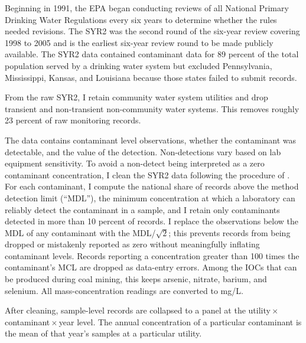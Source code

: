 \documentclass[12pt]{article}
\begin{document}
Beginning in 1991, the EPA began conducting reviews of all National Primary Drinking Water Regulations every six years to determine whether the rules needed revisions. The SYR2 was the second round of the six-year review covering 1998 to 2005 and is the earliest six-year review round to be made publicly available. The SYR2 data contained contaminant data for 89 percent of the total population served by a drinking water system but excluded Pennsylvania, Mississippi, Kansas, and Louisiana because those states failed to submit records. %

From the raw SYR2, I retain community water system utilities and drop transient and non-transient non-community water systems. This removes roughly 23 percent of raw monitoring records.

The data contains contaminant level observations, whether the contaminant was detectable, and the value of the detection. Non-detections vary based on lab equipment sensitivity. To avoid a non-detect being interpreted as a zero contaminant concentration, I clean the SYR2 data following the procedure of \textcite{ravalli2022sociodemographic}. For each contaminant, I compute the national share of records above the method detection limit (``MDL''), the minimum concentration at which a laboratory can reliably detect the contaminant in a sample, and I retain only contaminants detected in more than 10 percent of records. I replace the observations below the MDL of any contaminant with the MDL/$\sqrt{2}$; this prevents records from being dropped or mistakenly reported as zero without meaningfully inflating contaminant levels. Records reporting a concentration greater than 100 times the contaminant's MCL are dropped as data-entry errors. Among the IOCs that can be produced during coal mining, this keeps arsenic, nitrate, barium, and selenium. All mass-concentration readings are converted to mg/L. 

After cleaning, sample-level records are collapsed to a panel at the utility\,$\times$\,contaminant\,$\times$\,year level. The annual concentration of a particular contaminant is the mean of that year's samples at a particular utility.
\end{document}
